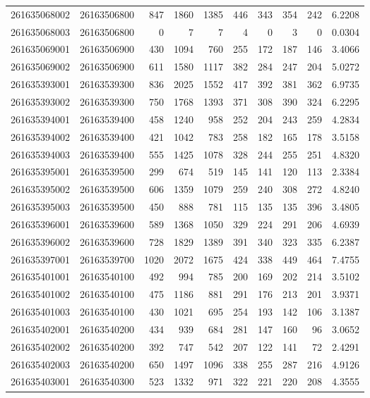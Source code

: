 \documentclass[
  11pt,
]{article}
\begin{document}
\begin{longtable}[t]{llrrrrrrrr}
261635068002 & 26163506800 & 847 & 1860 & 1385 & 446 & 343 & 354 & 242 & 6.2208\\
261635068003 & 26163506800 & 0 & 7 & 7 & 4 & 0 & 3 & 0 & 0.0304\\
261635069001 & 26163506900 & 430 & 1094 & 760 & 255 & 172 & 187 & 146 & 3.4066\\
261635069002 & 26163506900 & 611 & 1580 & 1117 & 382 & 284 & 247 & 204 & 5.0272\\
261635393001 & 26163539300 & 836 & 2025 & 1552 & 417 & 392 & 381 & 362 & 6.9735\\
261635393002 & 26163539300 & 750 & 1768 & 1393 & 371 & 308 & 390 & 324 & 6.2295\\
261635394001 & 26163539400 & 458 & 1240 & 958 & 252 & 204 & 243 & 259 & 4.2834\\
261635394002 & 26163539400 & 421 & 1042 & 783 & 258 & 182 & 165 & 178 & 3.5158\\
261635394003 & 26163539400 & 555 & 1425 & 1078 & 328 & 244 & 255 & 251 & 4.8320\\
261635395001 & 26163539500 & 299 & 674 & 519 & 145 & 141 & 120 & 113 & 2.3384\\
261635395002 & 26163539500 & 606 & 1359 & 1079 & 259 & 240 & 308 & 272 & 4.8240\\
261635395003 & 26163539500 & 450 & 888 & 781 & 115 & 135 & 135 & 396 & 3.4805\\
261635396001 & 26163539600 & 589 & 1368 & 1050 & 329 & 224 & 291 & 206 & 4.6939\\
261635396002 & 26163539600 & 728 & 1829 & 1389 & 391 & 340 & 323 & 335 & 6.2387\\
261635397001 & 26163539700 & 1020 & 2072 & 1675 & 424 & 338 & 449 & 464 & 7.4755\\
261635401001 & 26163540100 & 492 & 994 & 785 & 200 & 169 & 202 & 214 & 3.5102\\
261635401002 & 26163540100 & 475 & 1186 & 881 & 291 & 176 & 213 & 201 & 3.9371\\
261635401003 & 26163540100 & 430 & 1021 & 695 & 254 & 193 & 142 & 106 & 3.1387\\
261635402001 & 26163540200 & 434 & 939 & 684 & 281 & 147 & 160 & 96 & 3.0652\\
261635402002 & 26163540200 & 392 & 747 & 542 & 207 & 122 & 141 & 72 & 2.4291\\
261635402003 & 26163540200 & 650 & 1497 & 1096 & 338 & 255 & 287 & 216 & 4.9126\\
261635403001 & 26163540300 & 523 & 1332 & 971 & 322 & 221 & 220 & 208 & 4.3555\\

\end{longtable}
\end{document}
